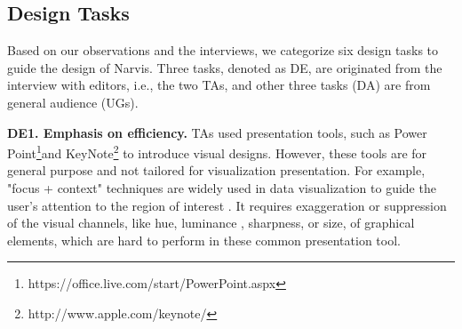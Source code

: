\subsection{Design Tasks}
Based on our observations and the interviews, we categorize six design tasks to guide the design of Narvis. Three tasks, denoted as DE, are originated from the interview with editors, i.e., the two TAs, and other three tasks (DA) are from general audience (UGs).

\noindent
\textbf{DE1. Emphasis on  efficiency.}
TAs used presentation tools, such as Power Point\footnote{https://office.live.com/start/PowerPoint.aspx}and KeyNote\footnote{http://www.apple.com/keynote/} to introduce visual designs. However, these tools are for general purpose and not tailored for visualization presentation. 
For example, "focus + context" techniques are widely used in data visualization to guide the user’s attention to the region of interest \cite{doleisch2003interactive, kosara2002focus+}. It requires exaggeration or suppression of the visual channels, like hue, luminance , sharpness, or size, of graphical elements, which are hard to perform in these common presentation tool. 

